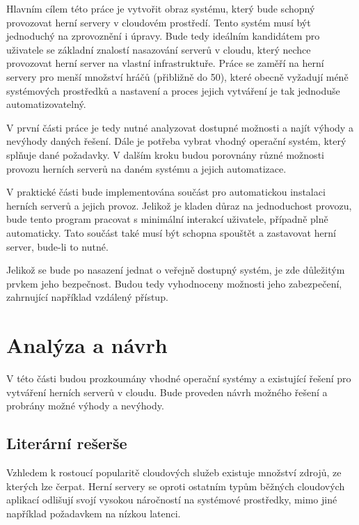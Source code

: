 \documentclass[thesis=B,czech]{FITthesis}[2019/12/23]
\begin{document}
Hlavním cílem této práce je vytvořit obraz systému, který bude schopný provozovat herní servery v cloudovém prostředí.
Tento systém musí být jednoduchý na zprovoznění i úpravy. Bude tedy ideálním kandidátem pro uživatele se základní znalostí
nasazování serverů v cloudu, který nechce provozovat herní server na vlastní infrastruktuře.
Práce se zaměří na herní servery pro menší množství hráčů (přibližně do 50), které obecně vyžadují méně systémových prostředků a nastavení
a proces jejich vytváření je tak jednoduše automatizovatelný.

V první části práce je tedy nutné analyzovat dostupné možnosti a najít výhody a nevýhody daných řešení. Dále je potřeba vybrat
vhodný operační systém, který splňuje dané požadavky. V dalším kroku budou porovnány různé možnosti provozu herních serverů
na daném systému a jejich automatizace.

V praktické části bude implementována součást pro automatickou instalaci herních serverů a jejich provoz. Jelikož je kladen důraz
na jednoduchost provozu, bude tento program pracovat s minimální interakcí uživatele, případně plně automaticky.
Tato součást také musí být schopna spouštět a zastavovat herní server, bude-li to nutné.

Jelikož se bude po nasazení jednat o veřejně dostupný systém, je zde důležitým prvkem jeho bezpečnost. Budou tedy vyhodnoceny možnosti
jeho zabezpečení, zahrnující například vzdálený přístup.

\chapter[Analýza]{Analýza a návrh}


V této části budou prozkoumány vhodné operační systémy a existující řešení pro vytváření herních serverů v cloudu.
Bude proveden návrh možného řešení a probrány možné výhody a nevýhody.

\section{Literární rešerše}

Vzhledem k rostoucí popularitě cloudových služeb \cite{statista_cloud_revenue} existuje množství zdrojů, ze kterých lze čerpat.
Herní servery se oproti ostatním typům běžných cloudových aplikací odlišují svojí vysokou náročností
na systémové prostředky, mimo jiné například požadavkem na nízkou latenci.
\end{document}
